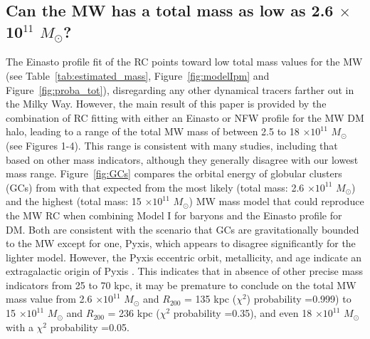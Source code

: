 \documentclass{aa}
\begin{document}
\subsection{Can the MW has a total mass as low as 2.6 $\times$ 10$^{11}$ $M_{\odot}$?}
The Einasto profile fit of the RC points toward low total mass values for the MW (see Table~\ref{tab:estimated_mass}, Figure~\ref{fig:modelIpm} and Figure~\ref{fig:proba_tot}), disregarding any other dynamical tracers farther out in the Milky Way. However, the main result of this paper is provided by the combination of RC fitting with either an Einasto or NFW profile for the MW DM halo, leading to a range of the total MW mass of between 2.5 to 18 $\times 10^{11}$ $M_{\odot}$ (see Figures 1-4). This range is consistent with many studies, including that based on other mass indicators, although they generally disagree with our lowest mass range. %
Figure~\ref{fig:GCs} compares the orbital energy of globular clusters (GCs) from \citet{Vasiliev2019} with that expected from the most likely (total mass: 2.6 $\times 10^{11}$ $M_{\odot}$) and the highest (total mass: 15 $\times 10^{11}$ $M_{\odot}$) MW mass model that could reproduce the MW RC when combining Model I for baryons and  the Einasto profile for DM. Both are consistent with the scenario that GCs are gravitationally bounded to the MW except for one, Pyxis, which appears to disagree significantly for the lighter model. However, the Pyxis eccentric orbit, metallicity, and age indicate an extragalactic origin of Pyxis \citep{Fritz2017}. This indicates that in absence of other precise mass indicators from 25 to 70 kpc, it may be premature to conclude on the total MW mass value from 2.6 $\times 10^{11}$ $M_{\odot}$ and $R_{200}$ = 135 kpc ($\chi^2$) probability =0.999) to 15 $\times 10^{11}$ $M_{\odot}$ and $R_{200}$ = 236 kpc ($\chi^2$ probability =0.35), and even 18 $\times 10^{11}$ $M_{\odot}$ with a $\chi^2$ probability =0.05.
\end{document}
